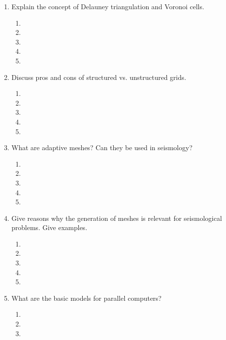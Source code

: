 \begin{enumerate}
\begin{enumerate}
\item[]
\item[]
\item[] 
\item[]
\item[] 
\end{enumerate}
\item
Explain the concept of Delauney triangulation and Voronoi cells.
\begin{enumerate}
\item[]
\item[]
\item[] 
\item[]
\item[] 
\end{enumerate}
\item
Discuss pros and cons of structured vs. unstructured grids. 
\begin{enumerate}
\item[]
\item[]
\item[] 
\item[]
\item[] 
\end{enumerate}
\item
What are adaptive meshes? Can they be used in seismology?
\begin{enumerate}
\item[]
\item[]
\item[] 
\item[]
\item[] 
\end{enumerate}
\item
Give reasons why the generation of meshes is relevant for seismological problems. Give examples.
\begin{enumerate}
\item[]
\item[]
\item[] 
\item[]
\item[] 
\end{enumerate}
\item
What are the basic models for parallel computers?
\begin{enumerate}
\item[]
\item[]
\item[] 

\end{enumerate}
\end{enumerate}
